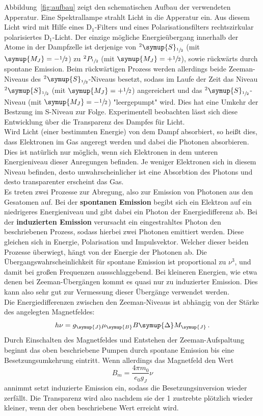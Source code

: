 %
Abbildung~\ref{fig:aufbau} zeigt den schematischen Aufbau der verwendeten
Apperatur. Eine Spektrallampe strahlt Licht in die Apperatur ein. Aus diesem
Licht wird mit Hilfe eines $\text{D}_1$-Filters und eines Polarisationsfilters
rechtszirkular polarisiertes $\text{D}_1$-Licht. Der einzige mögliche
Energieübergang innerhalb der Atome in der Dampfzelle ist derjenige von
$^2\symup{S}_{\sfrac{1}{2}}$ (mit $\symup{M_J}=-\sfrac{1}{2}$) zu
$^2P_{\sfrac{1}{2}}$ (mit $\symup{M_J}=+\sfrac{1}{2}$), sowie rückwärts durch
spontane Emission. Beim rückwärtigen Prozess werden allerdings beide
Zeeman-Niveaus des $^2\symup{S}_{\sfrac{1}{2}}$-Niveaus besetzt, sodass im
Laufe der Zeit das Niveau $^2\symup{S}_{\sfrac{1}{2}}$ (mit
$\symup{M_J}=+\sfrac{1}{2}$) angereichert und das
$^2\symup{S}_{\sfrac{1}{2}}$-Niveau (mit $\symup{M_J}=-\sfrac{1}{2}$)
"leergepumpt" wird. Dies hat eine Umkehr der Bestzung im S-Niveau zur Folge.
Experimentell beobachten lässt sich diese Entwicklung über die Transparenz des
Dampfes für Licht. \\
Wird Licht (einer bestimmten Energie) von dem Dampf absorbiert, so heißt dies,
dass Elektronen im Gas angeregt werden und dabei die Photonen absorbieren. Dies
ist natürlich nur möglich, wenn sich Elektronen in dem unteren Energieniveau
dieser Anregungen befinden. Je weniger Elektronen sich in diesem Niveau
befinden, desto unwahrscheinlicher ist eine Absorbtion des Photons und desto
transparenter erscheint das Gas.\\
Es treten zwei Prozesse zur Abregung, also zur Emission von Photonen aus den
Gesatomen auf. Bei der \textbf{spontanen Emission} begibt sich ein Elektron auf
ein niedrigeres Energieniveau und gibt dabei ein Photon der Energiedifferenz
ab. Bei der \textbf{induzierten Emission} verursacht ein eingestrahltes Photon
den beschriebenen Prozess, sodass hierbei zwei Photonen emittiert werden. Diese
gleichen sich in Energie, Polarisation und Impulsvektor. Welcher dieser beiden
Prozesse überwiegt, hängt von der Energie der Photonen ab. Die
Übergangswahrscheinlichkeit für spontane Emission ist proportional zu $\nu^3$,
und damit bei großen Frequenzen aussschlaggebend. Bei kleineren Energien, wie
etwa denen bei Zeeman-Übergängen kommt es quasi nur zu induzierter Emission.
Dies kann also sehr gut zur Vermessung dieser Übergänge verwendet werden. \\
Die Energiedifferenzen zwischen den Zeeman-Niveaus ist abhängig von der Stärke
des angelegten Magnetfeldes:
%
\begin{equation}
  h\nu=g_{\symup{J}}\mu_{\symup{B}}B\symup{\Delta}M_{\symup{J}} \, .
  \label{eq:übergangsenergie}
\end{equation}
%
Durch Einschalten des Magnetfeldes und Entstehen der Zeeman-Aufspaltung beginnt das oben
beschriebene Pumpen durch spontane Emission bis eine Besetzungsumkehrung eintritt. Wenn
allerdings das Magnetfeld den Wert
%
\begin{equation}
  B_m=\frac{4\pi m_0}{e_0g_J}\nu
\end{equation}
%
annimmt setzt induzierte Emission ein, sodass die Besetzungsinversion wieder
zerfällt. Die Transparenz wird also nachdem sie der 1 zustrebte plötzlich 
wieder kleiner, wenn der oben beschriebene Wert erreicht wird.

